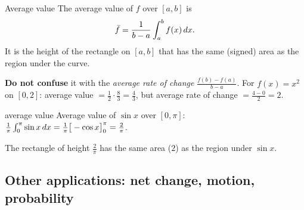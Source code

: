 \begin{cols}[0.6]
\begin{keyres}{Average value}
The average value of $f$ over $[a,b]$ is
\[\bar f=\frac{1}{b-a}\int_a^bf(x)\,dx.\]
It is the height of the rectangle on $[a,b]$ that has the same (signed) area as the region under the curve.\par
\textbf{Do not confuse} it with the \emph{average rate of change} $\frac{f(b)-f(a)}{b-a}$. For $f(x)=x^2$ on $[0,2]$: average value $=\frac12\cdot\frac83=\frac43$, but average rate of change $=\frac{4-0}{2}=2$.
\end{keyres}
\begin{example}{average value \byhand}
Average value of $\sin x$ over $[0,\pi]$: $\frac{1}{\pi}\int_0^\pi\sin x\,dx=\frac1\pi\big[-\cos x\big]_0^\pi=\frac{2}{\pi}$.
\end{example}
\nextcol[0.37]
\centering
{}

{\scriptsize The rectangle of height $\frac2\pi$ has the same area ($2$) as the region under $\sin x$.}
\end{cols}

\subsection{Other applications: net change, motion, probability}
\label{sec:apps}

